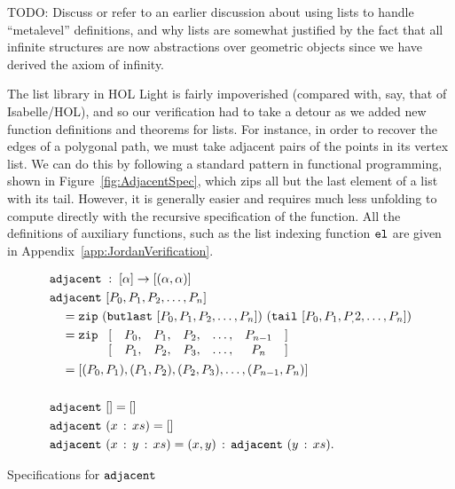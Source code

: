 
TODO: Discuss or refer to an earlier discussion about using lists to handle ``metalevel'' definitions, and why lists are somewhat justified by the fact that all infinite structures are now abstractions over geometric objects since we have derived the axiom of infinity.

The list library in HOL Light is fairly impoverished (compared with, say, that of Isabelle/HOL), and so our verification had to take a detour as we added new function definitions and theorems for lists. For instance, in order to recover the edges of a polygonal path, we must take adjacent pairs of the points in its vertex list. We can do this by following a standard pattern in functional programming, shown in Figure~\ref{fig:AdjacentSpec}, which zips all but the last element of a list with its tail. However, it is generally easier and requires much less unfolding to compute directly with the recursive specification of the function. All the definitions of auxiliary functions, such as the list indexing function $\texttt{el}$ are given in Appendix~\ref{app:JordanVerification}.

\begin{boxedfigure}
\begin{align*}
  &\code{adjacent}\; : \; [\alpha] \rightarrow [(\alpha,\alpha)]\\
  &\code{adjacent}\ [P_0,P_1,P_2,\ldots,P_n]\\
  &\quad=\code{zip}\ (\code{butlast}\ [P_0,P_1,P_2,\ldots,P_n])\ (\code{tail}\ [P_0,P_1,P_,2,\ldots,P_n])\\
  &\quad= \code{zip}\ \begin{array}[t]{rcccccl}\lbrack & P_0,&P_1,&P_2,&\ldots,&P_{n-1}&\rbrack\\
    \lbrack & P_1,&P_2,&P_3,&\ldots,&P_n&\rbrack
  \end{array}\\
  &\quad= [(P_0,P_1),(P_1,P_2),(P_2,P_3),\ldots,(P_{n-1},P_n)]\\\\
  &\code{adjacent}\ [] = []\\
  &\code{adjacent}\ (\cons{x}{xs}) = []\\
  &\code{adjacent}\ (\cons{x}{\cons{y}{xs}}) = \cons{(x,y)}{\code{adjacent}\ (\cons{y}{xs})}.
\end{align*}
\caption{Specifications for $\texttt{adjacent}$}
\label{fig:AdjacentSpec}
\end{boxedfigure}

